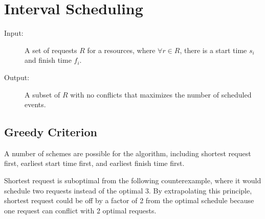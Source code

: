 \documentclass[11pt]{article}
\begin{document}
\section{Interval Scheduling}

	\begin{description}
		\item[Input:] A set of requests $R$ for a resources, where $\forall r \in R$, there is a start time $s_i$ and finish time $f_i$.
		\item[Output:] A subset of $R$ with no conflicts that maximizes the number of scheduled events.
	\end{description}
	
	\subsection{Greedy Criterion}
		A number of schemes are possible for the algorithm, including shortest request first, earliest start time first, and earliest finish time first.
		
		Shortest request is suboptimal from the following counterexample, where it would schedule two requests instead of the optimal 3. By extrapolating this principle, shortest request could be off by a factor of 2 from the optimal schedule because one request can conflict with 2 optimal requests.
		\begin{center}
		\end{center}
		
\end{document}
